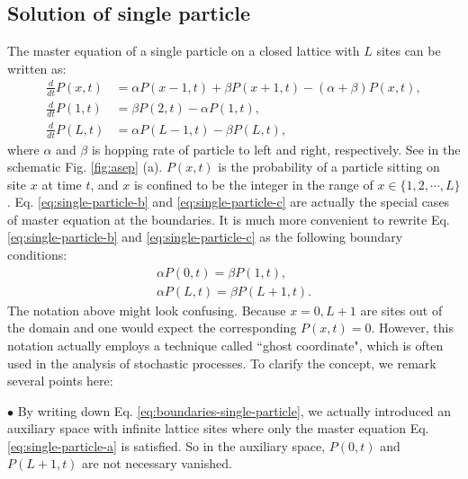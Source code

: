 \subsection{Solution of single particle}
\label{sub:solution_of_single_particle}
The master equation of a single particle on a closed lattice with $L$ sites can be written as:
\begin{subequations}
    \begin{align}
    \label{eq:single-particle-a}
    \frac{d}{dt} P(x,t) & =  \alpha P(x-1,t) + \beta P(x+1,t) - (\alpha + \beta)P(x,t), \\
    \label{eq:single-particle-b}
    \frac{d}{dt} P(1,t) & =  \beta P(2,t) - \alpha P(1,t),\\
    \label{eq:single-particle-c}
    \frac{d}{dt} P(L,t) & =  \alpha P(L-1,t) - \beta P(L,t),
    \end{align}
\end{subequations}
where $\alpha$ and $\beta$ is hopping rate of particle to left and right, respectively. See in the schematic Fig. \ref{fig:asep} (a). $P(x,t)$ is the probability of a particle sitting on site $x$ at time $t$, and $x$ is confined to be the integer in the range of $x\in\{1,2,\cdots,L\}$. Eq.  \eqref{eq:single-particle-b} and \eqref{eq:single-particle-c} are actually the special cases of master equation at the boundaries.  It is much more convenient to rewrite Eq. \eqref{eq:single-particle-b} and \eqref{eq:single-particle-c} as the following boundary conditions:
\begin{subequations}
    \label{eq:boundaries-single-particle}
    \begin{align}
        \label{eq:boundaries-single-particle-a}
        \alpha P(0,t) = \beta P(1,t),\\
        \label{eq:boundaries-single-particle-b}
        \alpha P(L,t) = \beta P(L+1,t).
    \end{align}
\end{subequations}
The notation above might look confusing. Because $x=0,L+1$ are sites out of the domain and one would expect the corresponding $P(x,t)=0$. However, this notation actually employs a technique called ``ghost coordinate", which is often used in the analysis of stochastic processes. To clarify the concept, we remark several points here:

$\bullet$ By writing down Eq. \eqref{eq:boundaries-single-particle}, we actually introduced an auxiliary space with infinite lattice sites where only the master equation Eq. \eqref{eq:single-particle-a} is satisfied. So in the auxiliary space, $P(0,t)$ and $P(L+1,t)$ are not necessary vanished.

